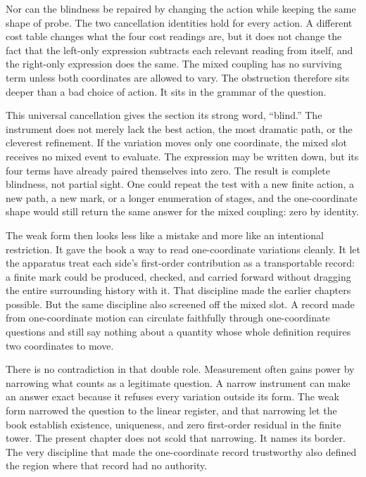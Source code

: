 Nor can the blindness be repaired by changing the action while keeping the same
shape of probe. The two cancellation identities hold for every action. A
different cost table changes what the four cost readings are, but it does not
change the fact that the left-only expression subtracts each relevant reading
from itself, and the right-only expression does the same. The mixed coupling
has no surviving term unless both coordinates are allowed to vary. The
obstruction therefore sits deeper than a bad choice of action. It sits in the
grammar of the question.

This universal cancellation gives the section its strong word, ``blind.'' The
instrument does not merely lack the best action, the most dramatic path, or the
cleverest refinement. If the variation moves only one coordinate, the mixed
slot receives no mixed event to evaluate. The expression may be written down,
but its four terms have already paired themselves into zero. The result is
complete blindness, not partial sight. One could repeat the test with a new
finite action, a new path, a new mark, or a longer enumeration of stages, and
the one-coordinate shape would still return the same answer for the mixed
coupling: zero by identity.

The weak form then looks less like a mistake and more like an intentional
restriction. It gave the book a way to read one-coordinate variations cleanly.
It let the apparatus treat each side's first-order contribution as a
transportable record: a finite mark could be produced, checked, and carried
forward without dragging the entire surrounding history with it. That
discipline made the earlier chapters possible. But the same discipline also
screened off the mixed slot. A record made from one-coordinate motion can
circulate faithfully through one-coordinate questions and still say nothing
about a quantity whose whole definition requires two coordinates to move.

There is no contradiction in that double role. Measurement often gains power
by narrowing what counts as a legitimate question. A narrow instrument can make
an answer exact because it refuses every variation outside its form. The weak
form narrowed the question to the linear register, and that narrowing let the
book establish existence, uniqueness, and zero first-order residual in the finite
tower. The present chapter does not scold that narrowing. It names its border.
The very discipline that made the one-coordinate record trustworthy also
defined the region where that record had no authority.

